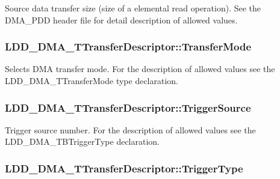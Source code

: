 Source data transfer size (size of a elemental read operation). See the D\-M\-A\-\_\-\-P\-D\-D header file for detail description of allowed values. \hypertarget{struct_l_d_d___d_m_a___t_transfer_descriptor_a0a932c1e965e131c25e45159f71831fe}{
\subsubsection[{Transfer\-Mode}]{ L\-D\-D\-\_\-\-D\-M\-A\-\_\-\-T\-Transfer\-Descriptor\-::\-Transfer\-Mode}}\label{struct_l_d_d___d_m_a___t_transfer_descriptor_a0a932c1e965e131c25e45159f71831fe}
Selects D\-M\-A transfer mode. For the description of allowed values see the L\-D\-D\-\_\-\-D\-M\-A\-\_\-\-T\-Transfer\-Mode type declaration. \hypertarget{struct_l_d_d___d_m_a___t_transfer_descriptor_a770d0bde209b081eafe87892ed333084}{
\subsubsection[{Trigger\-Source}]{ L\-D\-D\-\_\-\-D\-M\-A\-\_\-\-T\-Transfer\-Descriptor\-::\-Trigger\-Source}}\label{struct_l_d_d___d_m_a___t_transfer_descriptor_a770d0bde209b081eafe87892ed333084}
Trigger source number. For the description of allowed values see the L\-D\-D\-\_\-\-D\-M\-A\-\_\-\-T\-B\-Trigger\-Type declaration. \hypertarget{struct_l_d_d___d_m_a___t_transfer_descriptor_a1d1ff275b5c883b0cad1b20ef1929716}{
\subsubsection[{Trigger\-Type}]{ L\-D\-D\-\_\-\-D\-M\-A\-\_\-\-T\-Transfer\-Descriptor\-::\-Trigger\-Type}}\label{struct_l_d_d___d_m_a___t_transfer_descriptor_a1d1ff275b5c883b0cad1b20ef1929716}

